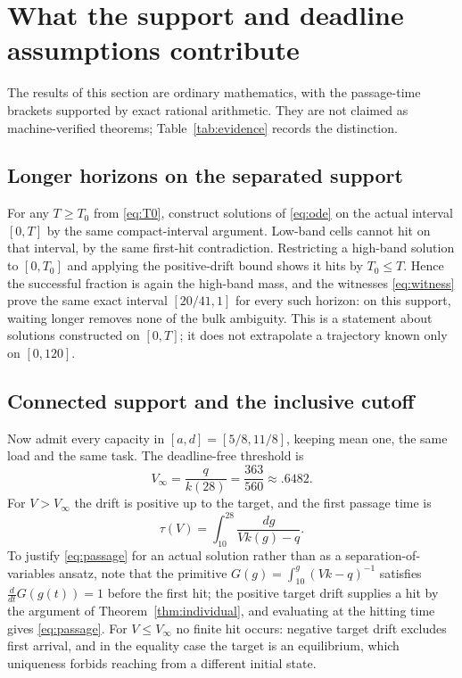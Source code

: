 \documentclass[11pt]{article}
\theoremstyle{definition}
\begin{document}
\section{What the support and deadline assumptions contribute}\label{sec:support}
The results of this section are ordinary mathematics, with the passage-time
brackets supported by exact rational arithmetic. They are not claimed as
machine-verified theorems; Table~\ref{tab:evidence} records the distinction.

\subsection{Longer horizons on the separated support}
For any $T\ge T_0$ from \eqref{eq:T0}, construct solutions of \eqref{eq:ode}
on the actual interval $[0,T]$ by the same compact-interval argument. Low-band
cells cannot hit on that interval, by the same first-hit contradiction.
Restricting a high-band solution to $[0,T_0]$ and applying the positive-drift
bound shows it hits by $T_0\le T$. Hence the successful fraction is again the
high-band mass, and the witnesses \eqref{eq:witness} prove the same exact
interval $[20/41,1]$ for every such horizon: on this support, waiting longer
removes none of the bulk ambiguity. This is a statement about solutions
constructed on $[0,T]$; it does not extrapolate a trajectory known only on
$[0,120]$.

\subsection{Connected support and the inclusive cutoff}
Now admit every capacity in $[a,d]=[5/8,11/8]$, keeping mean one, the same
load and the same task. The deadline-free threshold is
\begin{equation}\label{eq:Vinf}
  V_\infty=\frac q{k(28)}=\frac{363}{560}\approx.6482 .
\end{equation}
For $V>V_\infty$ the drift is positive up to the target, and the first passage
time is
\begin{equation}\label{eq:passage}
  \tau(V)=\int_{10}^{28}\frac{dg}{Vk(g)-q}.
\end{equation}
To justify \eqref{eq:passage} for an actual solution rather than as a
separation-of-variables ansatz, note that the primitive
$G(g)=\int_{10}^g(Vk-q)^{-1}$ satisfies $\frac{d}{dt}G(g(t))=1$ before the
first hit; the positive target drift supplies a hit by the argument of
Theorem~\ref{thm:individual}, and evaluating at the hitting time gives
\eqref{eq:passage}. For $V\le V_\infty$ no finite hit occurs: negative target
drift excludes first arrival, and in the equality case the target is an
equilibrium, which uniqueness forbids reaching from a different initial state.
\end{document}
